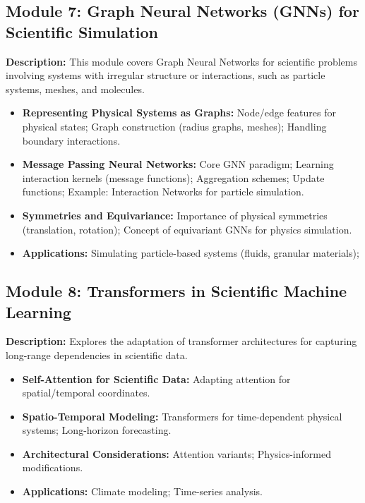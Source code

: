 \documentclass[11pt,fourier]{article}
\begin{document}
\subsection*{Module 7: Graph Neural Networks (GNNs) for Scientific Simulation}
\textbf{Description:} This module covers Graph Neural Networks for scientific problems involving systems with irregular structure or interactions, such as particle systems, meshes, and molecules.
\begin{itemize}
    \item \textbf{Representing Physical Systems as Graphs:} Node/edge features for physical states; Graph construction (radius graphs, meshes); Handling boundary interactions.
    \item \textbf{Message Passing Neural Networks:} Core GNN paradigm; Learning interaction kernels (message functions); Aggregation schemes; Update functions; Example: Interaction Networks for particle simulation.
    \item \textbf{Symmetries and Equivariance:} Importance of physical symmetries (translation, rotation); Concept of equivariant GNNs for physics simulation.
    \item \textbf{Applications:} Simulating particle-based systems (fluids, granular materials); \end{itemize}

\subsection*{Module 8: Transformers in Scientific Machine Learning}
\textbf{Description:} Explores the adaptation of transformer architectures for capturing long-range dependencies in scientific data.
\begin{itemize}
    \item \textbf{Self-Attention for Scientific Data:} Adapting attention for spatial/temporal coordinates.
    \item \textbf{Spatio-Temporal Modeling:} Transformers for time-dependent physical systems; Long-horizon forecasting.
    \item \textbf{Architectural Considerations:} Attention variants; Physics-informed modifications.
    \item \textbf{Applications:} Climate modeling; Time-series analysis.
\end{itemize}
\end{document}
